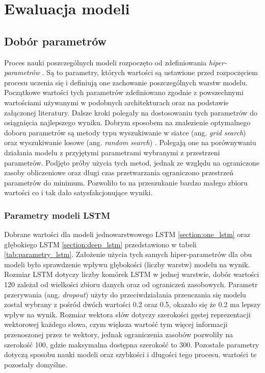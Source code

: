 \chapter{Ewaluacja modeli}

\section{Dobór parametrów}

Proces nauki poszczególnych modeli rozpoczęto od zdefiniowania \textit{hiper-parametrów} \cite{probst2018tunability}. Są to parametry, których wartości są ustawione przed rozpoczęciem procesu uczenia się i definiują one zachowanie poszczególnych warstw modelu. Początkowe wartości tych parametrów zdefiniowano zgodnie z powszechnymi wartościami używanymi w podobnych architekturach oraz na podstawie załączonej literatury. Dalsze kroki polegały na dostosowaniu tych parametrów do osiągnięcia najlepszego wyniku. Dobrym sposobem na znalezienie optymalnego doboru parametrów są metody typu wyszukiwanie w siatce (ang. \textit{grid search}) oraz wyszukiwanie losowe (ang. \textit{random search}) \cite{liashchynskyi2019grid}. Polegają one na porównywaniu działania modelu z przyjętymi parametrami wybranymi z przestrzeni parametrów. Podjęto próby użycia tych metod, jednak ze względu na ograniczone zasoby obliczeniowe oraz długi czas przetwarzania ograniczono przestrzeń parametrów do minimum. Pozwoliło to na przeszukanie bardzo małego zbioru wartości co i tak dało satysfakcjonujące wyniki.

\subsection{Parametry modeli LSTM}

Dobrane wartości dla modeli jednowarstwowego LSTM \ref{section:one_lstm} oraz głębokiego LSTM \ref{section:deep_lstm} przedstawiono w tabeli \ref{tab:parametry_lstm}. Założenie użycia tych samych hiper-parametrów dla obu modeli było sprawdzenie wpływu głębokości (liczby warstw) modelu na wynik. Rozmiar LSTM dotyczy liczby komórek LSTM w jednej warstwie, dobór wartości 120 zależał od wielkości zbioru danych oraz od ograniczeń zasobowych. Parametr przerywania (ang. \textit{dropout}) użyty do przeciwdziałania przeuczania się modelu został wybrany z pośród dwóch wartości 0.2 oraz 0.5, okazało się że 0.2 ma lepszy wpływ na wynik. Rozmiar wektora słów dotyczy szerokości gęstej reprezentacji wektorowej każdego słowa, czym większa wartość tym więcej informacji przenoszonej przez te wektory, jednak ograniczenia zasobów pozwoliły na szerokość 100, gdzie maksymalna dostępna szerokość to 300. Pozostałe parametry dotyczą sposobu nauki modeli oraz szybkości i długości tego procesu, wartości te pozostały domyślne.

